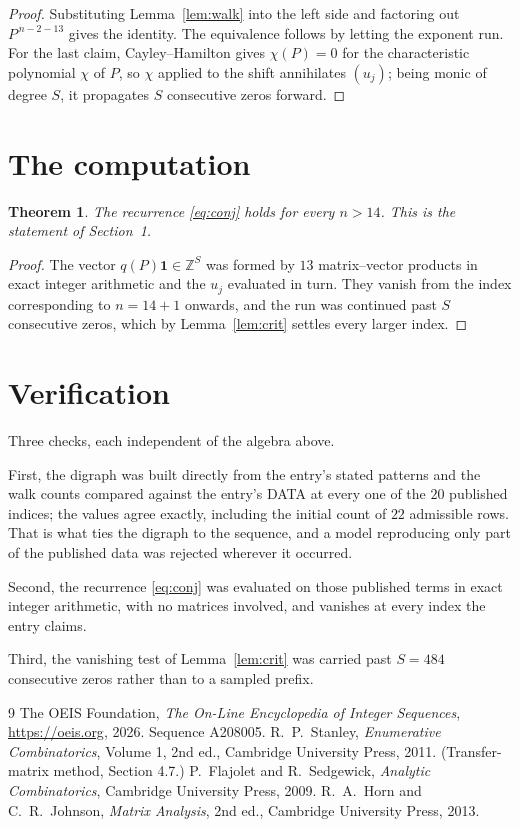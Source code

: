 \documentclass[11pt,a4paper]{article}
\theoremstyle{plain}
\newtheorem{theorem}{Theorem}
\theoremstyle{definition}
\begin{document}
\begin{proof}
Substituting Lemma~\ref{lem:walk} into the left side and factoring out
$P^{\,n-2-13}$ gives the identity. The equivalence follows by letting the exponent
run. For the last claim, Cayley--Hamilton gives $\chi(P)=0$ for the characteristic
polynomial $\chi$ of $P$, so $\chi$ applied to the shift annihilates $(u_j)$; being monic of
degree $S$, it propagates $S$ consecutive zeros forward.
\end{proof}

\section{The computation}

\begin{theorem}
The recurrence \eqref{eq:conj} holds for every $n>14$. This is the statement of
Section~1.
\end{theorem}

\begin{proof}
The vector $q(P)\mathbf{1}\in\mathbb{Z}^{S}$ was formed by $13$ matrix--vector
products in exact integer arithmetic and the $u_j$ evaluated in turn. They vanish from the
index corresponding to $n=14+1$ onwards, and the run was continued past $S$ consecutive
zeros, which by Lemma~\ref{lem:crit} settles every larger index.
\end{proof}

\section{Verification}

Three checks, each independent of the algebra above.

First, the digraph was built directly from the entry's stated patterns and the walk counts
compared against the entry's DATA at every one of the $20$ published indices; the
values agree exactly, including the initial count of $22$ admissible rows. That is
what ties the digraph to the sequence, and a model reproducing only part of the published
data was rejected wherever it occurred.

Second, the recurrence \eqref{eq:conj} was evaluated on those published terms in exact
integer arithmetic, with no matrices involved, and vanishes at every index the entry claims.

Third, the vanishing test of Lemma~\ref{lem:crit} was carried past $S=484$ consecutive
zeros rather than to a sampled prefix.

\begin{thebibliography}{9}
 The OEIS Foundation, \emph{The On-Line Encyclopedia of Integer
Sequences}, \url{https://oeis.org}, 2026. Sequence A208005.
 R.~P.~Stanley, \emph{Enumerative Combinatorics}, Volume 1, 2nd ed.,
Cambridge University Press, 2011. (Transfer-matrix method, Section 4.7.)
 P.~Flajolet and R.~Sedgewick, \emph{Analytic Combinatorics}, Cambridge
University Press, 2009.
 R.~A.~Horn and C.~R.~Johnson, \emph{Matrix Analysis}, 2nd ed., Cambridge
University Press, 2013.
\end{thebibliography}
\end{document}
